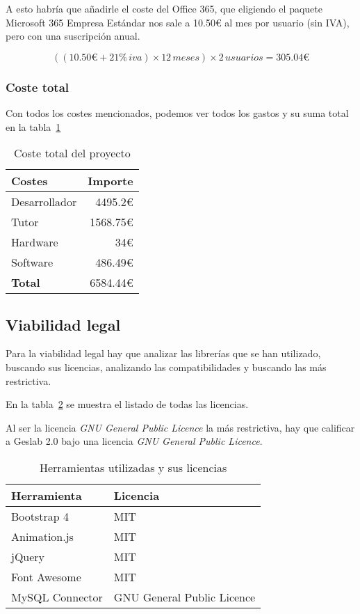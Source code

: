 A esto habría que añadirle el coste del Office 365, que eligiendo el paquete Microsoft 365 Empresa Estándar nos sale a 10.50€ al mes por usuario (sin IVA), pero con una suscripción anual.

\[ ((10.50 \euro + 21\% \, iva) \times 12\, meses) \times 2\, usuarios = 305.04 \euro\]

\subsubsection{Coste total}

Con todos los costes mencionados, podemos ver todos los gastos y su suma total en la tabla~\ref{tabla:costes}

\begin{table}[h]
	\centering
	\caption{Coste total del proyecto}
	\label{tabla:costes}
	\begin{tabular}{p{6cm} r}
		\toprule
		Costes & Importe \\ \midrule
		Desarrollador			     & 4495.2\euro   						\\
		Tutor  				         & 1568.75\euro							\\
		Hardware				     & 34\euro								\\
		Software 				     & 486.49\euro 							\\
		\textbf{Total} 			     & 6584.44\euro 						\\  
		\bottomrule
	\end{tabular}
\end{table}


\subsection{Viabilidad legal}
 Para la viabilidad legal hay que analizar las librerías que se han utilizado, buscando sus licencias, analizando las compatibilidades y buscando las más restrictiva.
 
En la tabla~\ref{tabla:licencias} se muestra el listado de todas las licencias.

Al ser la licencia \textit{GNU General Public Licence} la más restrictiva, hay que calificar a Geslab 2.0 bajo una licencia \textit{GNU General Public Licence}.

\begin{table}[h]
	\centering
	\caption{Herramientas utilizadas y sus licencias}
	\label{tabla:licencias}
	\begin{tabular}{p{4cm} p{6cm}}
		\toprule
		Herramienta & Licencia \\ \midrule
		Bootstrap 4				     & MIT   								\\
		Animation.js		         & MIT   								\\
		jQuery				         & MIT   								\\
		Font Awesome			     & MIT 									\\ 
		MySQL Connector				 & GNU General Public Licence			\\ \bottomrule
	\end{tabular}
\end{table}


